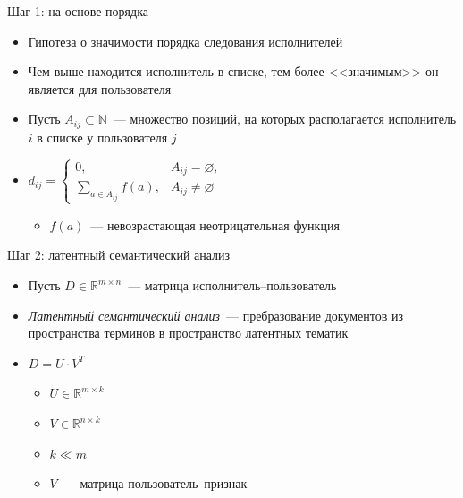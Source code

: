 \documentclass{beamer}
\begin{document}
\begin{frame}{Шаг 1: на основе порядка}
  \begin{itemize}
      \item {Гипотеза о значимости порядка следования исполнителей}
      \item {Чем выше находится исполнитель в списке,
               тем более <<значимым>> он является для пользователя}
      \item {Пусть $A_{ij} \subset \mathbb{N}$~--- множество позиций, на которых располагается
             исполнитель $i$ в списке у пользователя $j$}
      \item {$d_{ij} = \begin{cases}
          0,& A_{ij} = \varnothing,\\
          \sum\limits_{a \in A_{ij}}{f(a)},& A_{ij} \ne \varnothing 
      \end{cases}$}
      \begin{itemize}
          \item {$f(a)$~--- невозрастающая неотрицательная функция}
      \end{itemize}
  \end{itemize}
\end{frame}

\begin{frame}{Шаг 2: латентный семантический анализ}
  \begin{itemize}
      \item {Пусть $D \in \mathbb{R}^{m \times n}$~--- матрица исполнитель--пользователь}
      \item {\textit{Латентный семантический анализ}~--- пребразование документов из пространства
             терминов в пространство латентных тематик}
      \item {$D = U \cdot V^{T}$}
      \begin{itemize}
          \item {$U \in \mathbb{R}^{m \times k}$}
          \item {$V \in \mathbb{R}^{n \times k}$}
          \item {$k \ll m$}
          \item {$V$~--- матрица пользователь--признак}
      \end{itemize}
  \end{itemize}
\end{frame}
\end{document}
